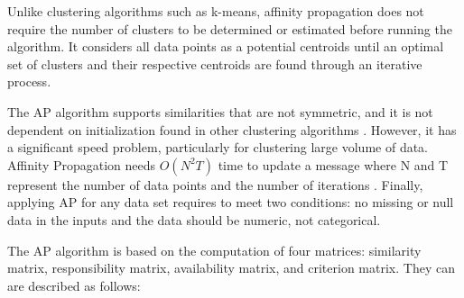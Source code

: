 

Unlike clustering algorithms such as k-means, affinity propagation does not require the number of clusters to be determined or estimated before running the algorithm. It considers all data points as a potential centroids until an optimal set of clusters and their respective centroids are found through an iterative process. %




The AP algorithm supports similarities that are not symmetric, and it is not dependent on initialization found in other clustering algorithms \cite{refianti2017time}. However, it has a significant speed problem, particularly for clustering large volume of data. Affinity Propagation needs $O(N^2T)$ time to update a message where N and T represent the number of data points and the number of iterations \cite{frey2007clustering}. Finally, applying AP for any data set requires to meet two conditions: no missing or null data in the inputs and the data should be numeric, not categorical.


The AP algorithm is based on the computation of four matrices: similarity matrix, responsibility matrix, availability matrix, and criterion matrix. They can are described as follows:

